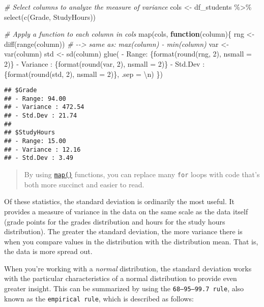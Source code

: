 \documentclass[
]{article}
\newenvironment{Shaded}{\begin{snugshade}}{\end{snugshade}}
\newcommand{\AttributeTok}[1]{\textcolor[rgb]{0.77,0.63,0.00}{#1}}
\newcommand{\CommentTok}[1]{\textcolor[rgb]{0.56,0.35,0.01}{\textit{#1}}}
\newcommand{\ControlFlowTok}[1]{\textcolor[rgb]{0.13,0.29,0.53}{\textbf{#1}}}
\newcommand{\FunctionTok}[1]{\textcolor[rgb]{0.00,0.00,0.00}{#1}}
\newcommand{\NormalTok}[1]{#1}
\newcommand{\OtherTok}[1]{\textcolor[rgb]{0.56,0.35,0.01}{#1}}
\newcommand{\SpecialCharTok}[1]{\textcolor[rgb]{0.00,0.00,0.00}{#1}}
\newcommand{\StringTok}[1]{\textcolor[rgb]{0.31,0.60,0.02}{#1}}
\begin{document}
\begin{Shaded}
\begin{Highlighting}[]
\CommentTok{\# Select columns to analyze the measure of variance}
\NormalTok{cols }\OtherTok{\textless{}{-}}\NormalTok{ df\_students }\SpecialCharTok{\%\textgreater{}\%}
  \FunctionTok{select}\NormalTok{(}\FunctionTok{c}\NormalTok{(Grade, StudyHours))}

\CommentTok{\# Apply a function to each column in cols}
\FunctionTok{map}\NormalTok{(cols, }\ControlFlowTok{function}\NormalTok{(column)\{}
\NormalTok{  rng }\OtherTok{\textless{}{-}} \FunctionTok{diff}\NormalTok{(}\FunctionTok{range}\NormalTok{(column)) }\CommentTok{\# {-}{-}\textgreater{} same as: max(column) {-} min(column)}
\NormalTok{  var }\OtherTok{\textless{}{-}} \FunctionTok{var}\NormalTok{(column)}
\NormalTok{  std }\OtherTok{\textless{}{-}} \FunctionTok{sd}\NormalTok{(column)}
  \FunctionTok{glue}\NormalTok{(}
  \StringTok{\textquotesingle{}}
\StringTok{  {-} Range: \{format(round(rng, 2), nsmall = 2)\}}
\StringTok{  {-} Variance : \{format(round(var, 2), nsmall = 2)\}}
\StringTok{  {-} Std.Dev : \{format(round(std, 2), nsmall = 2)\}\textquotesingle{}}\NormalTok{,}
  \AttributeTok{.sep =} \StringTok{\textquotesingle{}}\SpecialCharTok{\textbackslash{}n}\StringTok{\textquotesingle{}}\NormalTok{)}
\NormalTok{\})}
\end{Highlighting}
\end{Shaded}

\begin{verbatim}
## $Grade
## - Range: 94.00
## - Variance : 472.54
## - Std.Dev : 21.74
## 
## $StudyHours
## - Range: 15.00
## - Variance : 12.16
## - Std.Dev : 3.49
\end{verbatim}

\begin{quote}
By using
\href{https://purrr.tidyverse.org/reference/map.html}{\texttt{map()}}
functions, you can replace many \texttt{for} loops with code that's both
more succinct and easier to read.
\end{quote}

Of these statistics, the standard deviation is ordinarily the most
useful. It provides a measure of variance in the data on the same scale
as the data itself (grade points for the grades distribution and hours
for the study hours distribution). The greater the standard deviation,
the more variance there is when you compare values in the distribution
with the distribution mean. That is, the data is more spread out.

When you're working with a \emph{normal} distribution, the standard
deviation works with the particular characteristics of a normal
distribution to provide even greater insight. This can be summarized by
using the \texttt{68–95–99.7\ rule}, also known as the
\texttt{empirical\ rule}, which is described as follows:
\end{document}
